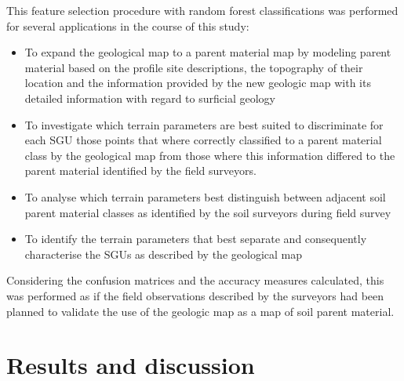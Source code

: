 \documentclass[preprint,12pt,authoryear]{elsarticle}
\begin{document}
This feature selection procedure with random forest classifications was performed for several applications in the course of this study:
\begin{itemize}
\item To expand the geological map to a parent material map by modeling parent material based on the profile site descriptions, the topography of their location and the information provided by the new geologic map with its detailed information with regard to surficial geology
\item To investigate which terrain parameters are best suited to discriminate for each SGU those points that where correctly classified to a parent material class by the geological map from those where this information differed to the parent material identified by the field surveyors.
\item To  analyse which terrain parameters best distinguish between adjacent soil parent material classes as identified by the soil surveyors during field survey
\item To identify the terrain parameters that best separate and consequently characterise the SGUs as described by the geological map
\end{itemize}
Considering the confusion matrices and the accuracy measures calculated, this was performed as if the field observations described by the surveyors had been planned to validate the use of the geologic map as a map of soil parent material.



\clearpage
\section{Results and discussion}
\end{document}
